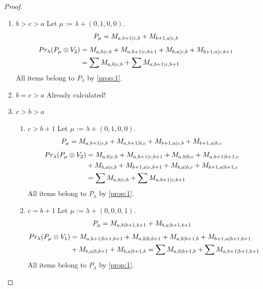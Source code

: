 \begin{proof}
\begin{enumerate}
\item $b>c>a$
        Let $\mu:=\lambda + (0,1,0,0) $. 
\begin{equation}\notag
  \begin{aligned}
      P_{\mu} =
M_{a,b+1|c,b}
+M_{b+1,a|c,b}
  \end{aligned}
\end{equation}
\begin{equation}\notag
  \begin{aligned}
    Pr_{\lambda}(P_\mu \otimes V_2) &=
M_{a,b|c,b}
+M_{a,b+1|c,b+1}
+M_{b,a|c,b}
+M_{b+1,a|c,b+1} \\
                                    &=
\sum M_{a,b|c,b}
+\sum M_{a,b+1|c,b+1}
  \end{aligned}
\end{equation}
All items belong to $P_\lambda$ by \cref{prop:1}.

\item $b=c>a$ Already calculated! 

\item $c>b>a$
  \begin{enumerate}
    \item $c>b+1$
        Let $\mu:=\lambda + (0,1,0,0) $. 
\begin{equation}\notag
  \begin{aligned}
      P_{\mu} =
M_{a,b+1|c,b}
+M_{a,b+1|b,c}
+M_{b+1,a|c,b}
+M_{b+1,a|b,c}
  \end{aligned}
\end{equation}
\begin{equation}\notag
  \begin{aligned}
    Pr_{\lambda}(P_\mu \otimes V_2) &=
M_{a,b|c,b}
+M_{a,b+1|c,b+1}
+M_{a,b|b,c}
+M_{a,b+1|b+1,c} \\
                                    &+
M_{b,a|c,b}
+M_{b+1,a|c,b+1}
+M_{b,a|b,c}
+M_{b+1,a|b+1,c}\\
                                    &=
\sum M_{a,b|c,b}
+\sum M_{a,b+1|c,b+1}
  \end{aligned}
\end{equation}
All items belong to $P_\lambda$ by \cref{prop:1}.

\item $c=b+1$
        Let $\mu:=\lambda + (0,0,0,1) $. 
\begin{equation}\notag
  \begin{aligned}
      P_{\mu} =
M_{a,b|b+1,b+1}
+M_{b,a|b+1,b+1}
  \end{aligned}
\end{equation}
\begin{equation}\notag
  \begin{aligned}
    Pr_{\lambda}(P_\mu \otimes V_1) &=
M_{a,b+1|b+1,b+1}
+M_{a,b|b,b+1}
+M_{a,b|b+1,b}
    +M_{b+1,a|b+1,b+1} \\
                                    &+
M_{b,a|b,b+1}
+M_{b,a|b+1,b}
=\sum M_{a,b|b+1,b}
+\sum M_{a,b+1|b+1,b+1}
  \end{aligned}
\end{equation}
All items belong to $P_\lambda$ by \cref{prop:1}.


\end{enumerate}
\end{enumerate}
\end{proof}
